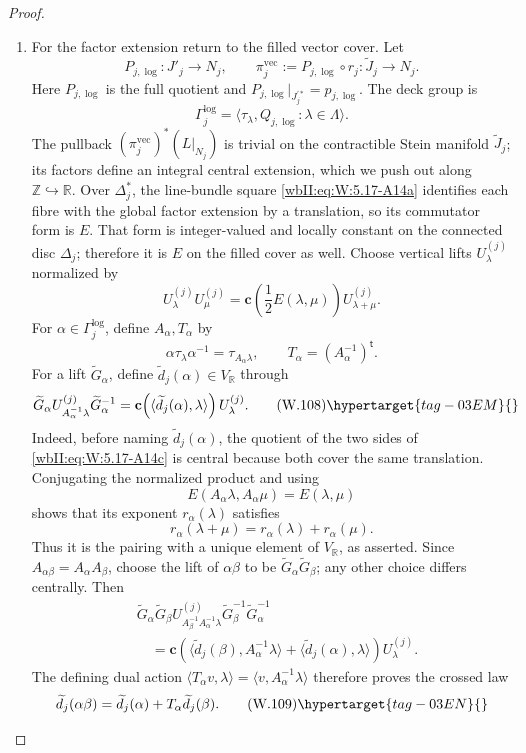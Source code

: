 \begin{proof}
\begin{enumerate}[label={$\langle1\rangle$\arabic*.},leftmargin=*]
\item For the factor extension return to the filled vector cover.  Let
\[
 P_{j,\log}:J'_j\longrightarrow N_j,\qquad
 \pi_j^{\mathrm{vec}}:=P_{j,\log}\circ r_j:
 \widetilde J_j\longrightarrow N_j .
\]
Here \(P_{j,\log}\) is the full quotient and
\(P_{j,\log}|_{J_j^{\prime *}}=p_{j,\log}\).
The deck group is
\[
 \Gamma_j^{\log}
 =\langle\tau_\lambda,Q_{j,\log}:\lambda\in\Lambda\rangle.
\]
The pullback \((\pi_j^{\mathrm{vec}})^*(L|_{N_j})\) is trivial on the
contractible Stein manifold \(\widetilde J_j\); its factors define an
integral central extension, which we push out along
\(\mathbb Z\hookrightarrow\mathbb R\).  Over \(\Delta_j^*\), the
line-bundle square \eqref{wbII:eq:W:5.17-A14a} identifies each fibre with the global factor
extension by a translation, so its commutator form is \(E\).  That form is
integer-valued and locally constant on the connected disc \(\Delta_j\);
therefore it is \(E\) on the filled cover as well.  Choose vertical lifts
\(U_\lambda^{(j)}\) normalized by
\[
 U_\lambda^{(j)}U_\mu^{(j)}
 =\mathbf c\!\left(\frac12E(\lambda,\mu)\right)
  U_{\lambda+\mu}^{(j)}.
\]
For \(\alpha\in\Gamma_j^{\log}\), define \(A_\alpha,T_\alpha\) by
\[
 \alpha\tau_\lambda\alpha^{-1}=\tau_{A_\alpha\lambda},\qquad
 T_\alpha=(A_\alpha^{-1})^{\mathsf t}.
\]
For a lift \(\widetilde G_\alpha\), define
\(\widetilde d_j(\alpha)\in V_{\mathbb R}\) through
\[
 \widetilde G_\alpha U_{A_\alpha^{-1}\lambda}^{(j)}
 \widetilde G_\alpha^{-1}
 =\mathbf c\!\left(\langle\widetilde d_j(\alpha),\lambda\rangle\right)
  U_\lambda^{(j)}.
\tag{W.108}\hypertarget{tag-03EM}{}\label{wbII:eq:W:5.17-A14c}
\]
Indeed, before naming \(\widetilde d_j(\alpha)\), the quotient of the two
sides of \eqref{wbII:eq:W:5.17-A14c} is central because both cover the same translation.
Conjugating the normalized product and using
\[
 E(A_\alpha\lambda,A_\alpha\mu)=E(\lambda,\mu)
\]
shows that its exponent \(r_\alpha(\lambda)\) satisfies
\[
 r_\alpha(\lambda+\mu)=r_\alpha(\lambda)+r_\alpha(\mu).
\]
Thus it is the pairing with a unique element of \(V_{\mathbb R}\), as
asserted.  Since \(A_{\alpha\beta}=A_\alpha A_\beta\), choose the lift of
\(\alpha\beta\) to be \(\widetilde G_\alpha\widetilde G_\beta\); any other
choice differs centrally.  Then
\[
\begin{aligned}
 &\widetilde G_\alpha\widetilde G_\beta
 U_{A_\beta^{-1}A_\alpha^{-1}\lambda}^{(j)}
 \widetilde G_\beta^{-1}\widetilde G_\alpha^{-1}\\
 &\quad=
 \mathbf c\!\left(
  \langle\widetilde d_j(\beta),A_\alpha^{-1}\lambda\rangle
  +\langle\widetilde d_j(\alpha),\lambda\rangle\right)
 U_\lambda^{(j)}.
\end{aligned}
\]
The defining dual action
\(\langle T_\alpha v,\lambda\rangle
=\langle v,A_\alpha^{-1}\lambda\rangle\) therefore proves the crossed law
\[
 \widetilde d_j(\alpha\beta)
 =\widetilde d_j(\alpha)+T_\alpha\widetilde d_j(\beta).
\tag{W.109}\hypertarget{tag-03EN}{}\label{wbII:eq:W:5.17-A14d}
\]


\end{enumerate}
\end{proof}
